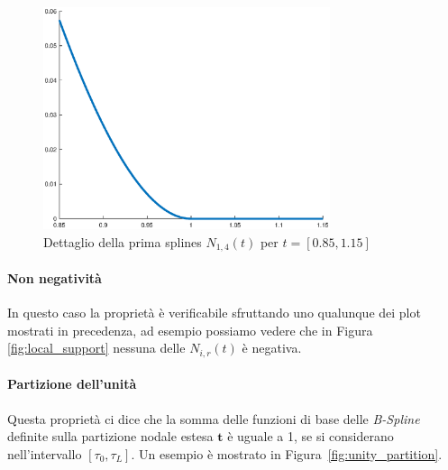 \documentclass[a4paper, 12pt]{article}
\begin{document}
\begin{figure}[]
  \centering
  \includegraphics[width=0.75\textwidth]{figure/first_property.eps}
  \caption{Dettaglio della prima splines $N_{1, 4}(t)$ per $t = [0.85, 1.15]$}
  \label{fig:first_property}
\end{figure} 
\paragraph{Non negatività} In questo caso la proprietà è verificabile sfruttando uno qualunque dei plot mostrati in precedenza,
 ad esempio possiamo vedere che in Figura \ref{fig:local_support} nessuna delle $N_{i, r}(t)$ è negativa.
\paragraph{Partizione dell'unità} Questa proprietà ci dice che 
la somma delle funzioni di base delle \textit{B-Spline} definite sulla partizione nodale estesa $\mathbf{t}$ è uguale a 1, se si considerano nell'intervallo 
$[\tau_0, \tau_L]$.
Un esempio è mostrato in Figura~\ref{fig:unity_partition}.
\end{document}
